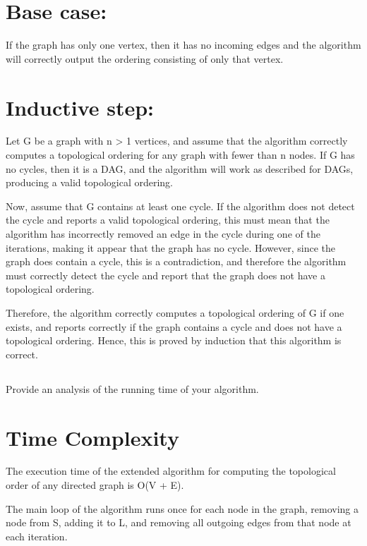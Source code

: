 \documentclass{article}
\begin{document}
\section*{\Large Base case:}
\large If the graph has only one vertex, then it has no incoming edges and the algorithm will correctly output the ordering consisting of only that vertex.\newline

\section*{\Large Inductive step:}
\large Let G be a graph with n > 1 vertices, and assume that the algorithm correctly computes a topological ordering for any graph with fewer than n nodes.
If G has no cycles, then it is a DAG, and the algorithm will work as described for DAGs, producing a valid topological ordering.\newline

Now, assume that G contains at least one cycle. If the algorithm does not detect the cycle and reports a valid topological ordering, this must mean that the algorithm has incorrectly removed an edge in the cycle during one of the iterations, making it appear that the graph has no cycle. However, since the graph does contain a cycle, this is a contradiction, and therefore the algorithm must correctly detect the cycle and report that the graph does not have a topological ordering.\newline

Therefore, the algorithm correctly computes a topological ordering of G if one exists, and reports correctly if the graph contains a cycle and does not have a topological ordering. Hence, this is proved by induction that this algorithm is correct.\newline

\subsection{}
\large Provide an analysis of the running time of your algorithm.

\section*{\Large Time Complexity}
\large The execution time of the extended algorithm for computing the topological order of any directed graph is O(V + E).\newline

The main loop of the algorithm runs once for each node in the graph, removing a node from S, adding it to L, and removing all outgoing edges from that node at each iteration.\newline
\end{document}
